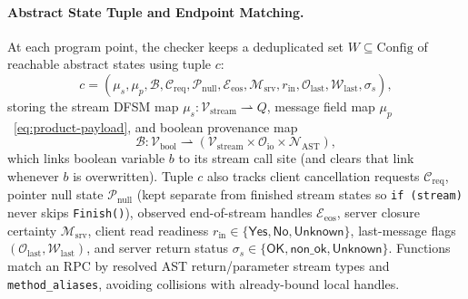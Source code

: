 \paragraph{Abstract State Tuple and Endpoint Matching.}
At each program point, the checker keeps a deduplicated set $W \subseteq \mathrm{Config}$ of reachable abstract states using tuple $c$:
\begin{equation}
\label{eq:abstract-config}
c = (\mu_s, \mu_p, \mathcal{B}, \mathcal{C}_{\mathrm{req}}, \mathcal{P}_{\mathrm{null}}, \mathcal{E}_{\mathrm{eos}}, \mathcal{M}_{\mathrm{srv}}, r_{\mathrm{in}}, \mathcal{O}_{\mathrm{last}}, \mathcal{W}_{\mathrm{last}}, \sigma_s),
\end{equation}
storing the stream DFSM map $\mu_s : \mathcal{V}_{\mathrm{stream}} \rightharpoonup Q$, message field map $\mu_p$~\eqref{eq:product-payload}, and boolean provenance map
\begin{equation}
\label{eq:bool-prov}
\mathcal{B} : \mathcal{V}_{\mathrm{bool}} \rightharpoonup (\mathcal{V}_{\mathrm{stream}} \times \mathcal{O}_{\mathrm{io}} \times \mathcal{N}_{\mathrm{AST}}),
\end{equation}
which links boolean variable $b$ to its stream call site (and clears that link whenever $b$ is overwritten). Tuple $c$ also tracks client cancellation requests $\mathcal{C}_{\mathrm{req}}$, pointer null state $\mathcal{P}_{\mathrm{null}}$ (kept separate from finished stream states so \texttt{if (stream)} never skips \texttt{Finish()}), observed end-of-stream handles $\mathcal{E}_{\mathrm{eos}}$, server closure certainty $\mathcal{M}_{\mathrm{srv}}$, client read readiness $r_{\mathrm{in}} \in \{\mathsf{Yes}, \mathsf{No}, \mathsf{Unknown}\}$, last-message flags $(\mathcal{O}_{\mathrm{last}}, \mathcal{W}_{\mathrm{last}})$, and server return status $\sigma_s \in \{\mathsf{OK}, \mathsf{non\_ok}, \mathsf{Unknown}\}$. Functions match an RPC by resolved AST return/parameter stream types and \texttt{method\_aliases}, avoiding collisions with already-bound local handles.

